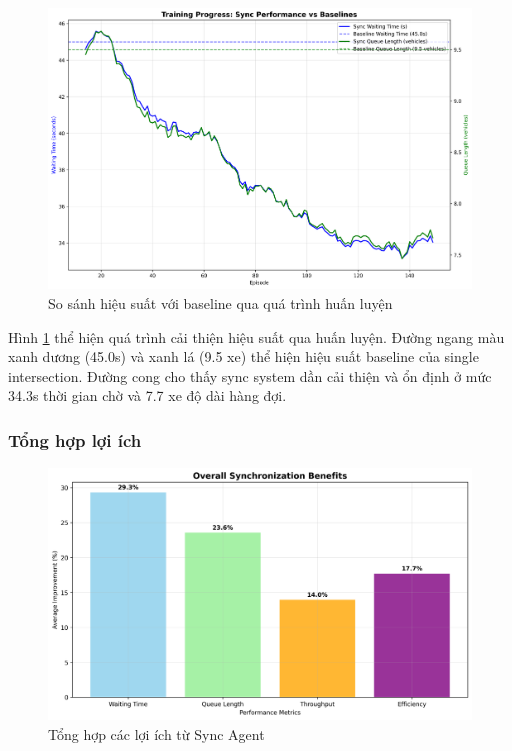 \begin{figure}[!htp]
    \centering
    \includegraphics[width=\textwidth]{figures/training_with_baselines.png}
    \caption{So sánh hiệu suất với baseline qua quá trình huấn luyện}
    \label{fig:training_with_baselines}
\end{figure}

Hình \ref{fig:training_with_baselines} thể hiện quá trình cải thiện hiệu suất 
qua huấn luyện. Đường ngang màu xanh dương (45.0s) và xanh lá (9.5 xe) thể hiện 
hiệu suất baseline của single intersection. Đường cong cho thấy sync system 
dần cải thiện và ổn định ở mức 34.3s thời gian chờ và 7.7 xe độ dài hàng đợi.

\subsubsection{Tổng hợp lợi ích}

\begin{figure}[!htp]
    \centering
    \includegraphics[width=\textwidth]{figures/overall_benefits.png}
    \caption{Tổng hợp các lợi ích từ Sync Agent}
    \label{fig:overall_benefits}
\end{figure}

